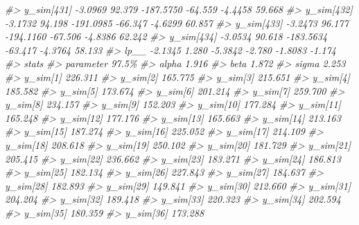 \documentclass[
  10pt,
  italian,
  a4paper,
  extrafontsizes,onecolumn,openright
  ]{memoir}
\newenvironment{Shaded}{\begin{snugshade}}{\end{snugshade}}
\newcommand{\CommentTok}[1]{\textcolor[rgb]{0.56,0.35,0.01}{\textit{#1}}}
\begin{document}
\begin{Shaded}
\begin{Highlighting}[]
\CommentTok{\#\textgreater{}   y\_sim[431] {-}3.0969  92.379 {-}187.5750 {-}64.559 {-}4.4458 59.668}
\CommentTok{\#\textgreater{}   y\_sim[432] {-}3.1732  94.198 {-}191.0985 {-}66.347 {-}4.6299 60.857}
\CommentTok{\#\textgreater{}   y\_sim[433] {-}3.2473  96.177 {-}194.1160 {-}67.506 {-}4.8386 62.242}
\CommentTok{\#\textgreater{}   y\_sim[434] {-}3.0534  90.618 {-}183.5634 {-}63.417 {-}4.3764 58.133}
\CommentTok{\#\textgreater{}   lp\_\_       {-}2.1345   1.280   {-}5.3842  {-}2.780 {-}1.8083 {-}1.174}
\CommentTok{\#\textgreater{}             stats}
\CommentTok{\#\textgreater{} parameter      97.5\%}
\CommentTok{\#\textgreater{}   alpha        1.916}
\CommentTok{\#\textgreater{}   beta         1.872}
\CommentTok{\#\textgreater{}   sigma        2.253}
\CommentTok{\#\textgreater{}   y\_sim[1]   226.311}
\CommentTok{\#\textgreater{}   y\_sim[2]   165.775}
\CommentTok{\#\textgreater{}   y\_sim[3]   215.651}
\CommentTok{\#\textgreater{}   y\_sim[4]   185.582}
\CommentTok{\#\textgreater{}   y\_sim[5]   173.674}
\CommentTok{\#\textgreater{}   y\_sim[6]   201.214}
\CommentTok{\#\textgreater{}   y\_sim[7]   259.700}
\CommentTok{\#\textgreater{}   y\_sim[8]   234.157}
\CommentTok{\#\textgreater{}   y\_sim[9]   152.203}
\CommentTok{\#\textgreater{}   y\_sim[10]  177.284}
\CommentTok{\#\textgreater{}   y\_sim[11]  165.248}
\CommentTok{\#\textgreater{}   y\_sim[12]  177.176}
\CommentTok{\#\textgreater{}   y\_sim[13]  165.663}
\CommentTok{\#\textgreater{}   y\_sim[14]  213.163}
\CommentTok{\#\textgreater{}   y\_sim[15]  187.274}
\CommentTok{\#\textgreater{}   y\_sim[16]  225.052}
\CommentTok{\#\textgreater{}   y\_sim[17]  214.109}
\CommentTok{\#\textgreater{}   y\_sim[18]  208.618}
\CommentTok{\#\textgreater{}   y\_sim[19]  250.102}
\CommentTok{\#\textgreater{}   y\_sim[20]  181.729}
\CommentTok{\#\textgreater{}   y\_sim[21]  205.415}
\CommentTok{\#\textgreater{}   y\_sim[22]  236.662}
\CommentTok{\#\textgreater{}   y\_sim[23]  183.271}
\CommentTok{\#\textgreater{}   y\_sim[24]  186.813}
\CommentTok{\#\textgreater{}   y\_sim[25]  182.134}
\CommentTok{\#\textgreater{}   y\_sim[26]  227.843}
\CommentTok{\#\textgreater{}   y\_sim[27]  184.637}
\CommentTok{\#\textgreater{}   y\_sim[28]  182.893}
\CommentTok{\#\textgreater{}   y\_sim[29]  149.841}
\CommentTok{\#\textgreater{}   y\_sim[30]  212.660}
\CommentTok{\#\textgreater{}   y\_sim[31]  204.204}
\CommentTok{\#\textgreater{}   y\_sim[32]  189.418}
\CommentTok{\#\textgreater{}   y\_sim[33]  220.323}
\CommentTok{\#\textgreater{}   y\_sim[34]  202.594}
\CommentTok{\#\textgreater{}   y\_sim[35]  180.359}
\CommentTok{\#\textgreater{}   y\_sim[36]  173.288}

\end{Highlighting}
\end{Shaded}
\end{document}
